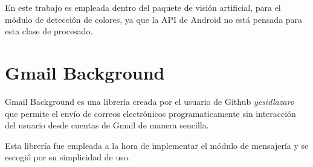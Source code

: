  En este trabajo es empleada dentro del paquete de visión artificial, para el módulo de detección de colores, ya que la API de Android no está pensada para esta clase de procesado.


 
 \section{Gmail Background}
  \label{subsec:gmail-background}
 
 Gmail Background\cite{gmailbg} es una librería creada por el usuario de Github \textit{yesidlazaro} que permite el envío de correos electrónicos programaticamente sin interacción del usuario desde cuentas de Gmail de manera sencilla.
 
 Esta librería fue empleada a la hora de implementar el módulo de mensajería y se escogió por su simplicidad de uso. 
 
 
 
 
 
 
 
 
 